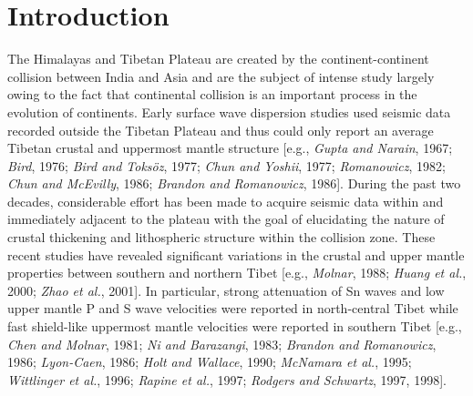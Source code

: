\documentclass[12pt]{article}
\begin{document}
\section{Introduction}

The Himalayas and Tibetan Plateau are created by the continent-continent collision between India and Asia
and are the subject of intense study largely owing to the fact that continental collision is an important
process in the evolution of continents.  Early  surface wave dispersion
studies used seismic data recorded outside the Tibetan Plateau and
thus could only report an average Tibetan
crustal and uppermost mantle structure [e.g., {\it Gupta and Narain}, 1967; {\it Bird}, 1976;
{\it Bird and Toks\"oz}, 1977;
{\it Chun and Yoshii}, 1977; {\it Romanowicz}, 1982; {\it Chun and McEvilly}, 1986;  {\it Brandon and
Romanowicz}, 1986].  During the past two decades, considerable effort has been made to acquire seismic data
within and immediately adjacent to the plateau with the goal of elucidating the nature of crustal
thickening and lithospheric structure within the collision zone.  These recent studies have revealed
significant variations in the crustal and upper mantle properties between southern and northern Tibet
[e.g., {\it Molnar}, 1988; {\it Huang et al.}, 2000; {\it Zhao et al.}, 2001].  In particular, strong
attenuation of Sn waves and low upper mantle P and S wave velocities were reported in north-central Tibet
while fast shield-like uppermost mantle velocities were reported in southern Tibet [e.g., {\it Chen and
Molnar}, 1981; {\it Ni and Barazangi}, 1983; {\it Brandon and Romanowicz}, 1986; {\it Lyon-Caen}, 1986;
{\it Holt and Wallace}, 1990; {\it McNamara et al.}, 1995; {\it Wittlinger et al.}, 1996;
{\it Rapine et al.}, 1997; {\it Rodgers and Schwartz}, 1997, 1998].
\end{document}

